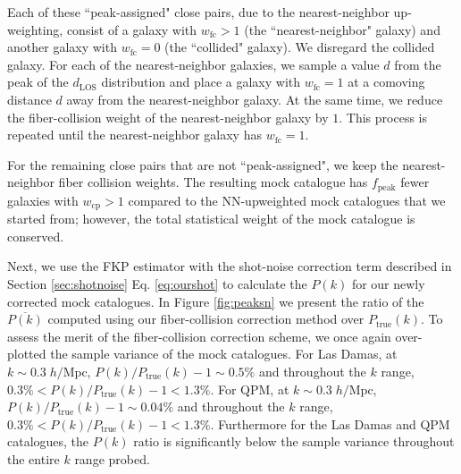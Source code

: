 \documentclass{emulateapj}
\begin{document}
Each of these ``peak-assigned" close pairs, due to the nearest-neighbor up-weighting, consist of a galaxy with $w_\mathrm{fc} > 1$ (the ``nearest-neighbor" galaxy) and another galaxy with $w_\mathrm{fc} = 0$ (the ``collided" galaxy). We disregard the collided galaxy. For each of the nearest-neighbor galaxies, we sample a value $d$ from the peak of the $d_\mathrm{LOS}$ distribution and place a galaxy with $w_\mathrm{fc} = 1$ at a comoving distance $d$ away from the nearest-neighbor galaxy. At the same time, we reduce the fiber-collision weight of the nearest-neighbor galaxy by $1$. This process is repeated until the nearest-neighbor galaxy has $w_\mathrm{fc} =1$. 

For the remaining close pairs that are not ``peak-assigned", we keep the nearest-neighbor fiber collision weights. The resulting mock catalogue has $f_\mathrm{peak}$ fewer galaxies with $w_\mathrm{cp} > 1$ compared to the NN-upweighted mock catalogues that we started from; however, the total statistical weight of the mock catalogue is conserved. 

Next, we use the FKP estimator with the shot-noise correction term described in Section \ref{sec:shotnoise} Eq. \ref{eq:ourshot} to calculate the $P(k)$ for our newly corrected mock catalogues. In Figure \ref{fig:peaksn} we present the ratio of the $\overline{P(k)}$ computed using our fiber-collision correction method over $P_\mathrm{true}(k)$. To assess the merit of the fiber-collision correction scheme, we once again over-plotted the sample variance of the mock catalogues. For Las Damas, at $k \sim 0.3 \; h/\mathrm{Mpc}$, $P(k)/P_\mathrm{true}(k) - 1 \sim 0.5 \%$ and throughout the $k$ range, $0.3 \% < P(k)/P_\mathrm{true}(k) - 1 < 1.3 \%$. For QPM, at $k \sim 0.3 \; h/\mathrm{Mpc}$, $P(k)/P_\mathrm{true}(k) - 1 \sim 0.04 \%$ and throughout the $k$ range, $0.3 \% < P(k)/P_\mathrm{true}(k) - 1 < 1.3 \%$. %
Furthermore for the Las Damas and QPM catalogues, the $P(k)$ ratio is significantly below the sample variance throughout the entire $k$ range probed.

\end{document}
